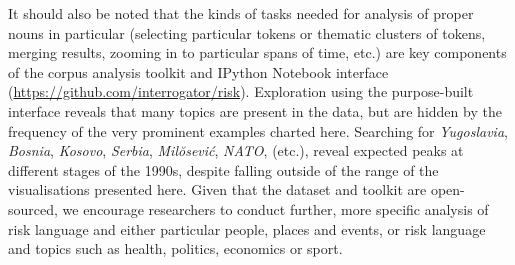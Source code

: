                 It should also be noted that the kinds of tasks needed for analysis of proper nouns in particular (selecting particular tokens or thematic clusters of tokens, merging results, zooming in to particular spans of time, etc.) are key components of the corpus analysis toolkit and IPython Notebook interface (\url{https://github.com/interrogator/risk}). Exploration using the purpose-built interface reveals that many topics are present in the data, but are hidden by the frequency of the very prominent examples charted here. Searching for \emph{Yugoslavia}, \emph{Bosnia}, \emph{Kosovo}, \emph{Serbia}, \emph{Mil{\u o}sevi{\'c}}, \emph{\textsc{NATO}}, (etc.), reveal expected peaks at different stages of the 1990s, despite falling outside of the range of the visualisations presented here. Given that the dataset and toolkit are open-sourced, we encourage researchers to conduct further, more specific analysis of risk language and either particular people, places and events, or risk language and topics such as health, politics, economics or sport.


%


